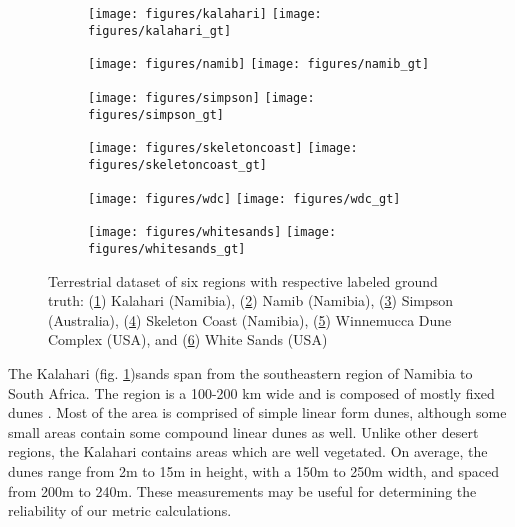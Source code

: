 \documentclass[review]{elsarticle}
\begin{document}
\begin{figure}
	\centering
	\begin{subfigure}{\textwidth}
		\centering
		\texttt{[image: figures/kalahari]}
		\texttt{[image: figures/kalahari\_gt]}
		\caption{}
		\label{fig:kalahari_image}
	\end{subfigure}
	\begin{subfigure}{\textwidth}
		\centering
		\texttt{[image: figures/namib]}
		\texttt{[image: figures/namib\_gt]}
		\caption{}
		\label{fig:namib_image}
	\end{subfigure}
	\begin{subfigure}{\textwidth}
		\centering
		\texttt{[image: figures/simpson]}
		\texttt{[image: figures/simpson\_gt]}
		\caption{}
		\label{fig:simpson_image}
	\end{subfigure}
	\begin{subfigure}{\textwidth}
		\centering
		\texttt{[image: figures/skeletoncoast]}
		\texttt{[image: figures/skeletoncoast\_gt]}
		\caption{}
		\label{fig:skeleton_coast_image}
	\end{subfigure}
	\begin{subfigure}{\textwidth}
		\centering
		\texttt{[image: figures/wdc]}
		\texttt{[image: figures/wdc\_gt]}
		\caption{}
		\label{fig:wdc_image}
	\end{subfigure}
	\begin{subfigure}{\textwidth}
		\centering
		\texttt{[image: figures/whitesands]}
		\texttt{[image: figures/whitesands\_gt]}
		\caption{}
		\label{fig:white_sands_image}
	\end{subfigure}
	
	\caption{Terrestrial dataset of six regions with respective labeled ground truth: (\ref{fig:kalahari_image}) Kalahari (Namibia), (\ref{fig:namib_image}) Namib (Namibia), (\ref{fig:simpson_image}) Simpson (Australia), (\ref{fig:skeleton_coast_image}) Skeleton Coast (Namibia), (\ref{fig:wdc_image}) Winnemucca Dune Complex (USA), and (\ref{fig:white_sands_image}) White Sands (USA)}
	\label{fig:terrestrial_dataset}
\end{figure}

The Kalahari (fig. \ref{fig:kalahari_image})sands span from the southeastern region of Namibia to South Africa. The region is a 100-200 km wide and is composed of mostly fixed dunes \cite{lancaster_linear_dunes_kalahari}. Most of the area is comprised of simple linear form dunes, although some small areas contain some compound linear dunes as well. Unlike other desert regions, the Kalahari contains areas which are well vegetated. On average, the dunes range from 2m to 15m in height, with a 150m to 250m width, and spaced from 200m to 240m. These measurements may be useful for determining the reliability of our metric calculations.
\end{document}
